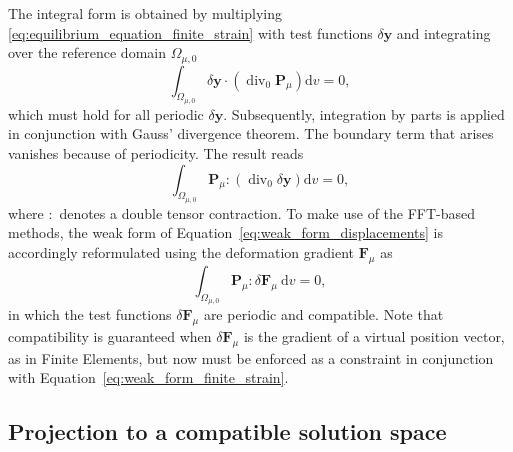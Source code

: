 The integral form is obtained by multiplying \eqref{eq:equilibrium_equation_finite_strain} with test functions \(\delta \bm y\) and integrating over the reference domain \(\Omega_{\mu,0}\)
\begin{equation}
\int_{\Omega_{\mu,0}} \delta \bm y \cdot\left(\operatorname{div}_0 \bm{P}_\mu\right) \mathrm{d} v=0,
\end{equation}
which must hold for all periodic \(\delta \bm y\).
Subsequently, integration by parts is applied in conjunction with Gauss' divergence theorem.
The boundary term that arises vanishes because of periodicity.
The result reads
\begin{equation} \label{eq:weak_form_displacements}
\int_{\Omega_{\mu,0}}\bm{P}_\mu:\left(\operatorname{div}_0 \delta \bm y\right) \mathrm{d} v=0,
\end{equation}
where \(:\) denotes a double tensor contraction.
To make use of the FFT-based methods, the weak form of Equation~\eqref{eq:weak_form_displacements} is accordingly reformulated using the deformation gradient \(\bm F_\mu\) as
\begin{equation} \label{eq:weak_form_finite_strain}
\int_{\Omega_{\mu,0}}  \bm{P}_\mu:\delta\bm{F}_\mu \mathrm{~d} v=0,
\end{equation}
in which the test functions \(\delta \bm{F}_\mu\) are periodic and compatible.
Note that compatibility is guaranteed when \(\delta \bm{F}_\mu\) is the gradient of a virtual position vector, as in Finite Elements, but now must be enforced as a constraint in conjunction with Equation~\eqref{eq:weak_form_finite_strain}.

\subsection{Projection to a compatible solution space}

